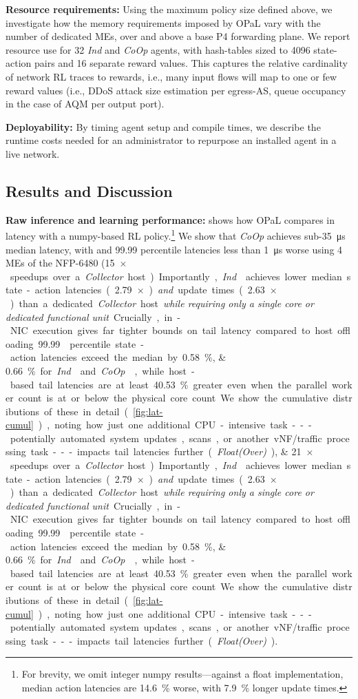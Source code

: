 \documentclass[
sigconf,natbib=false
,anonymous=true
,10pt
]{acmart}
\newcommand{\fakepara}[1]{\noindent\textbf{#1:}}
\newcommand{\approachshort}{OPaL}
\newcommand{\Coopfw}{\emph{CoOp}}
\newcommand{\Indfw}{\emph{Ind}}
\begin{document}
\fakepara{Resource requirements}
Using the maximum policy size defined above, we investigate how the memory requirements imposed by \approachshort{} vary with the number of dedicated MEs, over and above a base P4 forwarding plane.
We report resource use for \SI{32}{\bit} \Indfw{} and \Coopfw{} agents, with hash-tables sized to \num{4096} state-action pairs and \num{16} separate reward values.
This captures the relative cardinality of network RL traces to rewards, i.e., many input flows will map to one or few reward values (i.e., DDoS attack size estimation per egress-AS, queue occupancy in the case of AQM per output port).


\fakepara{Deployability}
By timing agent setup and compile times, we describe the runtime costs needed for an administrator to repurpose an installed agent in a live network.

\subsection{Results and Discussion}\label{sec:results}
\fakepara{Raw inference and learning performance}
 shows how \approachshort{} compares in latency with a numpy-based RL policy.\footnote{For brevity, we omit integer numpy results---against a float implementation, median action latencies are \SI{14.6}{\percent} worse, with \SI{7.9}{\percent} longer update times.}
We show that \Coopfw{} achieves sub-\SI{35}{\micro\second} median latency, with  and \num{99.99} percentile latencies less than \SI{1}{\micro\second} worse using 4 MEs of the NFP-6480 (\SIlist{15;21}{$\times$} speedups over a \emph{Collector} host).
Importantly, \Indfw{} achieves lower median state-action latencies (\SI{2.79}{$\times$}) \emph{and} update times (\SI{2.63}{$\times$}) than a dedicated \emph{Collector} host \emph{while requiring only a single core or dedicated functional unit}.
Crucially, in-NIC execution gives far tighter bounds on tail latency compared to host offloading.
\num{99.99} percentile state-action latencies exceed the median by \SIlist{0.58;0.66}{\percent} for \Indfw{} and \Coopfw{}, while host-based tail latencies are at least \SI{40.53}{\percent} greater even when the parallel worker count is at or below the physical core count.
We show the cumulative distributions of these in detail (\cref{fig:lat-cumul}), noting how just one additional CPU-intensive task---potentially automated system updates, scans, or another vNF/traffic processing task---impacts tail latencies further (\emph{Float(Over)}).
\end{document}
